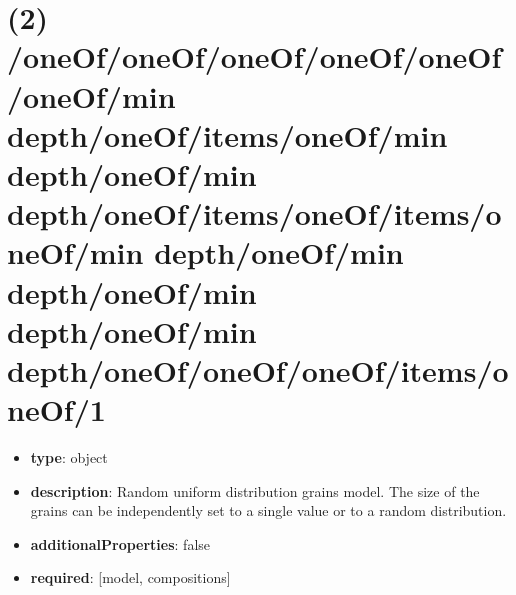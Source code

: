 \section{(2) /oneOf/oneOf/oneOf/oneOf/oneOf/oneOf/min depth/oneOf/items/oneOf/min depth/oneOf/min depth/oneOf/items/oneOf/items/oneOf/min depth/oneOf/min depth/oneOf/min depth/oneOf/min depth/oneOf/oneOf/oneOf/items/oneOf/1}
\begin{itemize}[leftmargin=2em]\item {\bf type}: object
\item {\bf description}: Random uniform distribution grains model. The size of the grains can be independently set to a single value or to a random distribution.
\item {\bf additionalProperties}: false
\item {\bf required}: [model, compositions]\end{itemize}
